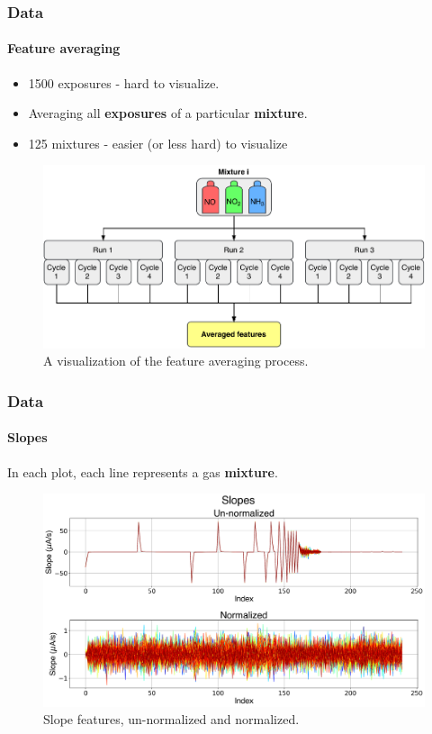 \documentclass{beamer}
\begin{document}
\begin{frame}
	\frametitle{Data}
	\framesubtitle{Feature averaging}
	
	\begin{itemize}
		\pause
		\item 1500 exposures - hard to visualize.
		\pause
		\item Averaging all \textbf{exposures} of a particular \textbf{mixture}.
		
	\pause
	\item 125 mixtures - easier (or less hard) to visualize
	\end{itemize}

	\begin{figure}[h]
	\centering
	\includegraphics[width=1\textwidth]{../../figures/averaging-process.pdf}
	\caption{A visualization of the feature averaging process.}
	\label{fig:averaging-process}
\end{figure}
\end{frame}

\begin{frame}
	\frametitle{Data}
	\framesubtitle{Slopes}
		In each plot, each line represents a gas \textbf{mixture}.
		\begin{figure}[b]
			\includegraphics[width=1\linewidth]{../../figures/slopes.png}
			\caption{Slope features, un-normalized and normalized.}
			\label{fig:slopes} 
		\end{figure}
	
\end{frame}
\end{document}
